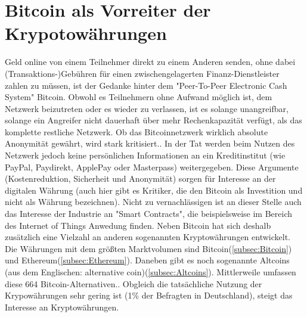 \section{Bitcoin als Vorreiter der Krypotowährungen}
Geld online von einem Teilnehmer direkt zu einem Anderen senden, ohne dabei (Transaktions-)Gebühren für einen zwischengelagerten Finanz-Dienstleister zahlen zu müssen, ist der Gedanke hinter dem "Peer-To-Peer Electronic Cash System"\citep{nakamoto_bitcoin:_2008} Bitcoin. Obwohl es Teilnehmern ohne Aufwand möglich ist, dem Netzwerk beizutreten oder es wieder zu verlassen, ist es solange unangreifbar, solange ein Angreifer nicht dauerhaft über mehr Rechenkapazität verfügt, als das komplette restliche Netzwerk.\citep{nakamoto_bitcoin:_2008} Ob das Bitcoinnetzwerk wirklich absolute Anonymität gewährt, wird stark kritisiert.\citep{reid_analysis_2013,androulaki_evaluating_2013}. In der Tat werden beim Nutzen des Netzwerk jedoch keine persönlichen Informationen an ein Kreditinstitut (wie PayPal, Paydirekt, ApplePay oder Masterpass) weitergegeben. Diese Argumente (Kostenreduktion, Sicherheit und Anonymität) sorgen für Interesse an der digitalen Währung (auch hier gibt es Kritiker, die den Bitcoin als Investition und nicht als Währung bezeichnen)\citep{baur_bitcoin:_2015}. Nicht zu vernachlässigen ist an dieser Stelle auch das Interesse der Industrie an "Smart Contracts"\citep[S.~10]{dannen_introducing_2017}, die beispielsweise im Bereich des Internet of Things Anwedung finden.\citep{christidis_blockchains_2016}\newline
Neben Bitcoin hat sich deshalb zusätzlich eine Vielzahl an anderen sogenannten Kryptowährungen entwickelt. Die Währungen mit dem größten Marktvolumen sind  Bitcoin(\ref{subsec:Bitcoin}) und Ethereum(\ref{subsec:Ethereum})\citep{wood_ethereum:_2014}.\citep{brandt_infografik:_2017, coinmarketcap_ranking_2017} Daneben gibt es noch sogenannte Altcoins (aus dem Englischen: alternative coin\citep{prableen_bajpai_altcoin_2014})(\ref{subsec:Altcoins}). Mittlerweile umfassen diese 664 Bitcoin-Alternativen.\citep{coindesk_anzahl_2017}. Obgleich die tatsächliche Nutzung der Krypowährungen sehr gering ist (1\% der Befragten in Deutschland\citep{tsys_kennen_2016}), steigt das Interesse an Kryptowährungen\citep{wikitrends_compare_2017,googletrends_googletrends_2017}.\newline
{}

